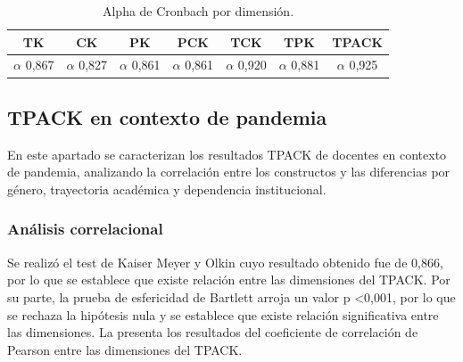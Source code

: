 \documentclass[spanish]{textolivre}
\begin{document}
\begin{table}[h!]
\centering
\begin{threeparttable}
\caption{Alpha de Cronbach por dimensión.}
\label{tab01}
\centering
\begin{tabular}{*{7}{S}}
\toprule
{TK} & {CK} & {PK} & {PCK} & {TCK} & {TPK} & {TPACK} \\
\midrule
$\alpha$ 0,867 & $\alpha$ 0,827 & $\alpha$ 0,861 & $\alpha$ 0,861 & $\alpha$ 0,920 & $\alpha$ 0,881 & $\alpha$ 0,925 \\
\bottomrule
\end{tabular}
\end{threeparttable}
\end{table}

\subsection{TPACK en contexto de pandemia}\label{sec-resumo}
En este apartado se caracterizan los resultados TPACK de docentes en contexto de pandemia, analizando la correlación entre los constructos y las diferencias por género, trayectoria académica y dependencia institucional.

\subsubsection{Análisis correlacional}\label{sec-secoes}
Se realizó el test de Kaiser Meyer y Olkin cuyo resultado obtenido fue de 0,866, por lo que se establece que existe relación entre las dimensiones del TPACK. Por su parte, la prueba de esfericidad de Bartlett arroja un valor p <0,001, por lo que se rechaza la hipótesis nula y se establece que existe relación significativa entre las dimensiones. La  presenta los resultados del coeficiente de correlación de Pearson entre las dimensiones del TPACK.

\end{document}
